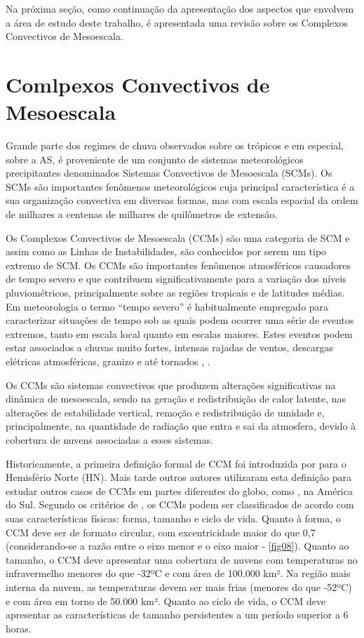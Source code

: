 Na próxima seção, como continuação da apresentação dos aspectos que envolvem a área de estudo deste trabalho, é apresentada uma revisão sobre os Complexos Convectivos de Mesoescala.

\section{Comlpexos Convectivos de Mesoescala}
\label{ss:ccm}

Grande parte dos regimes de chuva observados sobre os trópicos e em especial, sobre a AS, é proveniente de um conjunto de sistemas meteorológicos precipitantes denominados Sistemas Convectivos de Mesoescala (SCMs). Os SCMs são importantes fenômenos meteorológicos cuja principal característica é a sua organização convectiva em diversas formas, mas com escala espacial da ordem de milhares a centenas de milhares de quilômetros de extensão.

Os Complexos Convectivos de Mesoescala (CCMs) são uma categoria de SCM e assim como as Linhas de Instabilidades, são conhecidos por serem um tipo extremo de SCM. Os CCMs são importantes fenômenos atmosféricos causadores de tempo severo e que contribuem significativamente para a variação dos níveis pluviométricos, principalmente sobre as regiões tropicais e de latitudes médias. Em meteorologia o termo ``tempo severo'' é habitualmente empregado para caracterizar situações de tempo sob as quais podem ocorrer uma série de eventos extremos, tanto em escala local quanto em escalas maiores. Estes eventos podem estar associados a chuvas muito fortes, intensas rajadas de ventos, descargas elétricas atmosféricas, granizo e até tornados \cite{maddox80}, \cite{menezessilvadias04}.

Os CCMs são sistemas convectivos que produzem alterações significativas na dinâmica de mesoescala, sendo na geração e redistribuição de calor latente, nas alterações de estabilidade vertical, remoção e redistribuição de umidade e, principalmente, na quantidade de radiação que entra e sai da atmosfera, devido à cobertura de nuvens associadas a esses sistemas.

Historicamente, a primeira definição formal de CCM foi introduzida por  para o Hemisfério Norte (HN). Mais tarde outros autores utilizaram esta definição para estudar outros casos de CCMs em partes diferentes do globo, como , na América do Sul. Segundo os critérios de , os CCMs podem ser classificados de acordo com suas características físicas: forma, tamanho e ciclo de vida. Quanto à forma, o CCM deve ser de formato circular, com excentricidade maior do que 0,7 (considerando-se a razão entre o eixo menor e o eixo maior - \autoref{fig08}). Quanto ao tamanho, o CCM deve apresentar uma cobertura de nuvens com temperaturas no infravermelho menores do que -32ºC e com área de 100.000 km². Na região mais interna da nuvem, as temperaturas devem ser mais frias (menores do que -52ºC) e com área em torno de 50.000 km². Quanto ao ciclo de vida, o CCM deve apresentar as características de tamanho persistentes a um período superior a 6 horas.

